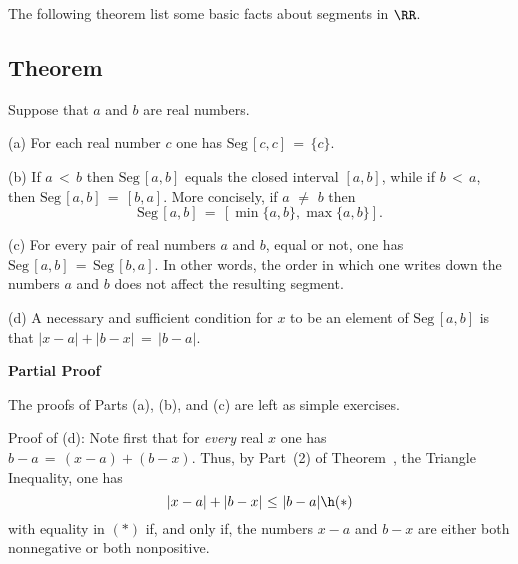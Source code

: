\V
\V

        The following theorem list some basic facts about segments in ${\RR}$.

\V

            \subsection{\small{\bf Theorem}}
            \label{ThmB20.150}

\V

        Suppose that $a$ and $b$ are real numbers.

\V

        (a) For each real number $c$ one has $\mbox{Seg}\,[c,c] \,=\, \{c\}$.


\V

        (b) If $a\,<\,b$ then $\mbox{Seg}\,[a,b]$ equals the closed interval $[a,b]$, while if $b\,<\,a$, then $\mbox{Seg}\,[a,b] \,=\, [b,a]$.
    More concisely, if $a \,\,{\neq}\,\, b$ then
        \begin{equation}
        \label{EqnB.75}
        \mbox{Seg}\,[a,b] \,=\, [\min\{a,b\},\max\{a,b\}].
        \end{equation}

\V

        (c) For every pair of real numbers $a$ and $b$, equal or not, one has $\mbox{Seg}\,[a,b] \,=\, \mbox{Seg}\,[b,a]$.
    In other words, the order in which one writes down the numbers $a$ and $b$ does not affect the resulting segment.


\V


        (d) A necessary and sufficient condition for $x$ to be an element of $\mbox{Seg}\,[a,b]$ is that $|x-a|+|b-x| \,=\, |b-a|$.


\V

        {\bf Partial Proof}

\V

        The proofs of Parts (a), (b), and (c) are left as simple exercises.

\V

        Proof of (d): Note first that for {\em every} real $x$ one has $b-a \,=\, (x-a) + (b-x)$.
    Thus, by Part~(2) of Theorem~, the Triangle Inequality, one has
        \begin{displaymath}
        |x-a| + |b-x|\,\,{\leq}\,\,|b-a| \h ({\ast})
        \end{displaymath}
    with equality in $({\ast})$ if, and only if, the numbers $x-a$ and $b-x$ are either both nonnegative or both nonpositive.

